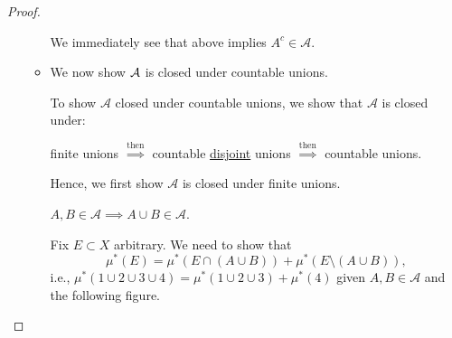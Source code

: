 \begin{proof}
\begin{enumerate}[(1)]
\begin{itemize}
\begin{explanation}
				            We immediately see that above implies \(A^{c} \in\mathcal{A} \).
			            \end{explanation}
			      \item We now show \(\mathcal{\MakeUppercase{a}} \) is closed under countable unions.
			            \begin{note}
				            To show \(\mathcal{A} \) closed under countable unions, we show that \(\mathcal{A}\) is closed under:
				            \begin{center}
					            finite unions \(\overset{\text{then}}{\implies}\) countable \underline{disjoint} unions \(\overset{\text{then}}{\implies}\) countable unions.
				            \end{center}
			            \end{note}
			            Hence, we first show \(\mathcal{A} \) is closed under finite unions.
			            \begin{claim}\label{pf:Caratheodory-extension-Thm-1-finite-unions}
				            \(A, B\in \mathcal{A} \implies A\cup B\in \mathcal{A}\).
			            \end{claim}
			            \begin{explanation}
				            Fix \(E\subset X\) arbitrary. We need to show that
				            \[
					            \mu^{*} (E) = \mu^{*} (E\cap (A\cup B)) + \mu^{*} (E\setminus (A\cup B)),
				            \]
				            i.e.,
				            \(\mu^{*} (1\cup 2\cup 3\cup 4) = \mu^{*} (1\cup 2\cup 3) + \mu^{*} (4)\) given \(A, B\in\mathcal{A}\) and the following figure.
				            \begin{figure}[H]
					            \centering
					            \label{fig:thm:Caratheodory-extension-Thm-1a}
				            \end{figure}


\end{explanation}
\end{itemize}
\end{enumerate}
\end{proof}
